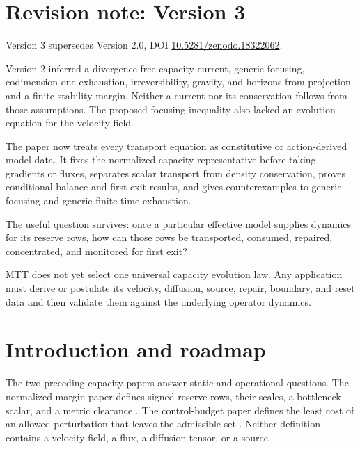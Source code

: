 \documentclass[11pt]{article}
\theoremstyle{definition}
\theoremstyle{remark}
\begin{document}
\section*{Revision note: Version 3}
\begin{description}[leftmargin=2.5cm,style=nextline]
\item[Supersedes]
Version 3 supersedes Version 2.0, DOI
\href{https://doi.org/10.5281/zenodo.18322062}
{10.5281/zenodo.18322062}.

\item[Reason]
Version 2 inferred a divergence-free capacity current, generic focusing,
codimension-one exhaustion, irreversibility, gravity, and horizons from
projection and a finite stability margin.  Neither a current nor its
conservation follows from those assumptions.  The proposed focusing
inequality also lacked an evolution equation for the velocity field.

\item[Resolution]
The paper now treats every transport equation as constitutive or
action-derived model data.  It fixes the normalized capacity
representative before taking gradients or fluxes, separates scalar
transport from density conservation, proves conditional balance and
first-exit results, and gives counterexamples to generic focusing and
generic finite-time exhaustion.

\item[Retained content]
The useful question survives: once a particular effective model supplies
dynamics for its reserve rows, how can those rows be transported,
consumed, repaired, concentrated, and monitored for first exit?

\item[Remaining boundary]
MTT does not yet select one universal capacity evolution law.  Any
application must derive or postulate its velocity, diffusion, source,
repair, boundary, and reset data and then validate them against the
underlying operator dynamics.
\end{description}

\tableofcontents

\section{Introduction and roadmap}
\label{sec:intro}

The two preceding capacity papers answer static and operational questions.
The normalized-margin paper defines signed reserve rows, their scales, a
bottleneck scalar, and a metric clearance \cite{CapacityMargin2026}.  The
control-budget paper defines the least cost of an allowed perturbation that
leaves the admissible set \cite{CapacityBudget2026}.  Neither definition
contains a velocity field, a flux, a diffusion tensor, or a source.
\end{document}
